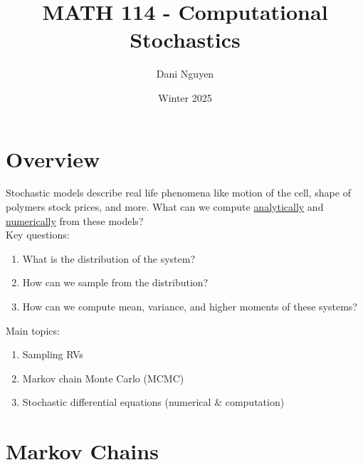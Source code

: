 \documentclass[12pt, letterpaper]{article}
\title{MATH 114 - Computational Stochastics}
\author{Dani Nguyen}
\date{Winter 2025}
\begin{document}
\maketitle
\tableofcontents

\section{Overview}
Stochastic models describe real life phenomena like motion of the cell, shape of polymers
stock prices, and more. What can we compute \underline{analytically} and \underline{numerically} from these models? \\

\noindent Key questions:
\begin{enumerate}
    \item What is the distribution of the system?
    \item How can we sample from the distribution?
    \item How can we compute mean, variance, and higher moments of these systems?
\end{enumerate} 
\noindent Main topics:
\begin{enumerate}
    \item Sampling RVs
    \item Markov chain Monte Carlo (MCMC)
    \item Stochastic differential equations (numerical \& computation)
\end{enumerate}

\section{Markov Chains}
\end{document}
